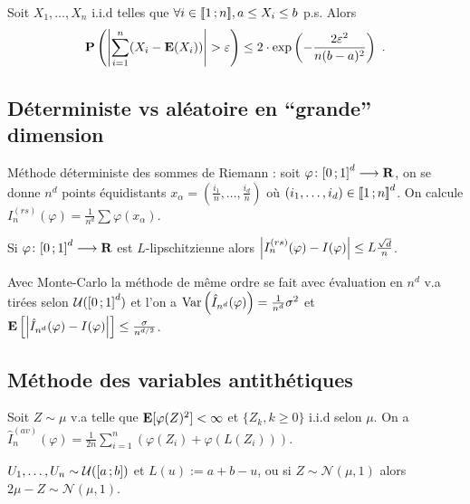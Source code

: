 	\begin{thm}
		Soit $X_1,\ldots,X_n$ i.i.d telles que $\forall i \in \mathopen{[\![}1\mathclose{}\mathpunct{};n\mathclose{]\!]}, a \leq X_i \leq b$ p.s.
		Alors
		$$\proba \left( \abs{\sum_{i = 1}^n (X_i - \esp(X_i)) } > \varepsilon \right) \leq 2 \cdot \exp \left( - \frac{2 \varepsilon^2}{n(b - a)^2} \right)\ .$$
	\end{thm}


\subsection{Déterministe vs aléatoire en “grande” dimension}

	\noindent Méthode déterministe des sommes de Riemann : soit $\varphi \colon \mathopen{[}0\mathclose{}\mathpunct{};1\mathclose{]}^d \longrightarrow \mathbf{R}$, on se donne $n^d$ points équidistants $x_\alpha = \left( \frac{i_1}{n},\ldots,\frac{i_d}{n} \right)$ où $(i_1,\ldots,i_d) \in \mathopen{}\mathclose{\left[\![1\mathclose{}\mathpunct{};n\right]\!]}^d$.
	On calcule $I_n^{(rs)}(\varphi) = \frac{1}{n^d} \sum \varphi (x_\alpha)$.

	\begin{pop}
		Si $\varphi \colon \mathopen{[}0\mathclose{}\mathpunct{};1\mathclose{]}^d \longrightarrow \mathbf{R}$ est $L$-lipschitzienne alors $\left\lvert I_n^{(rs)}(\varphi) - I(\varphi)\right\rvert \leq L \frac{\sqrt{d}}{n}$.
	\end{pop}

	\noindent Avec Monte-Carlo la méthode de même ordre se fait avec évaluation en $n^d$ v.a tirées selon $\mathcal{U}(\mathopen{[}0\mathclose{}\mathpunct{};1\mathclose{]}^d)$ et l'on a $\operatorname{Var} \left( \hat{I}_{n^d}(\varphi) \right) = \frac{1}{n^d} \sigma^2$ et $\mathbf{E} \left[ \left\lvert\hat{I}_{n^d}(\varphi) - I(\varphi)\right\rvert \right] \leq \frac{\sigma}{n^{d/2}}$.


\subsection{Méthode des variables antithétiques}

	\noindent Soit $Z \sim \mu$ v.a telle que $\mathbf{E}[\varphi(Z)^2] < \infty$ et $\{ Z_k, k \geq 0 \}$ i.i.d selon $\mu$.
	On a $\hat{I}_n^{(av)}(\varphi) = \frac{1}{2n} \sum_{i = 1}^n (\varphi(Z_i) + \varphi(L(Z_i)))$.
	
	\begin{ex}
		$U_1,\ldots,U_n \sim \mathcal{U}(\mathopen{[}a\mathclose{}\mathpunct{};b\mathclose{]})$ et $L(u) := a + b - u$, ou si $Z \sim \mathcal{N}(\mu,1)$ alors $2 \mu - Z \sim \mathcal{N}(\mu,1)$.
	\end{ex}
	
